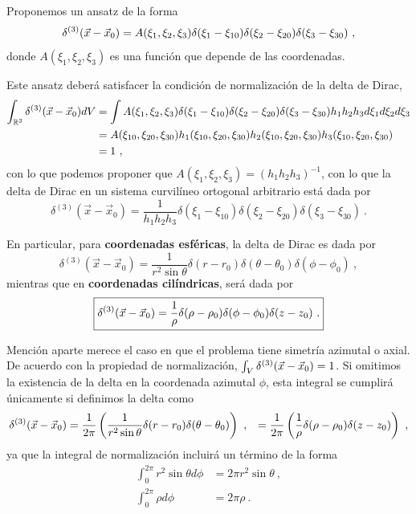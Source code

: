 \begin{demo}
    Proponemos un ansatz de la forma
    \begin{equation*}
        \delta^{(3)} (\vec{x}-\vec{x}_0) = A(\xi_1, \xi_2, \xi_3) \delta(\xi_1 - \xi_{10}) \delta(\xi_2 - \xi_{20}) \delta(\xi_3 - \xi_{30}) \ ,
    \end{equation*}
    donde $A(\xi_1, \xi_2, \xi_3)$ es una función que depende de las coordenadas.

    Este ansatz deberá satisfacer la condición de normalización de la delta de Dirac, 
    \begin{align*}
        \int_{\mathbb{R}^3} \delta^{(3)} (\vec{x} - \vec{x}_0) dV & = \int A(\xi_1, \xi_2, \xi_3) \delta(\xi_1 - \xi_{10}) \delta(\xi_2 - \xi_{20}) \delta(\xi_3 - \xi_{30}) h_1 h_2 h_3 d\xi_1 d\xi_2 d\xi_3 \\ 
        & = A(\xi_{10}, \xi_{20}, \xi_{30}) h_1(\xi_{10}, \xi_{20}, \xi_{30}) h_2(\xi_{10}, \xi_{20}, \xi_{30}) h_3(\xi_{10}, \xi_{20}, \xi_{30}) \\
        & = 1 \ ,
    \end{align*}
    con lo que podemos proponer que $A(\xi_1, \xi_2, \xi_3) = (h_1 h_2 h_3)^{-1}$, con lo que la delta de Dirac en un sistema curvilíneo ortogonal arbitrario está dada por
    \begin{equation*}
        \delta^{(3)}(\vec{x}-\vec{x}_0) = \frac{1}{h_1 h_2 h_3} \delta(\xi_1 - \xi_{10}) \delta(\xi_2 - \xi_{20}) \delta(\xi_3 - \xi_{30}) \ .
    \end{equation*}
\end{demo}

En particular, para \textbf{coordenadas esféricas}, la delta de Dirac es dada por
\begin{equation}
    \boxed{\delta^{(3)}(\vec{x} - \vec{x}_0) = \frac{1}{r^2 \sin\theta} \delta(r-r_0) \delta(\theta-\theta_0) \delta(\phi - \phi_0) \ ,}
\end{equation}
mientras que en \textbf{coordenadas cilíndricas}, será dada por
\begin{equation}
    \boxed{\delta^{(3)}(\x - \x_0) = \frac{1}{\rho} \delta(\rho - \rho_0) \delta(\phi-\phi_0) \delta(z-z_0) \ .}
\end{equation}

Mención aparte merece el caso en que el problema tiene simetría azimutal o axial. De acuerdo con la propiedad de normalización, $\int_V \delta^{(3)}(\vec{x}-\vec{x}_0) = 1$. Si omitimos la existencia de la delta en la coordenada azimutal $\phi$, esta integral se cumplirá únicamente si definimos la delta como
\begin{align*}
    \delta^{(3)}(\x - \x_0) & = \frac{1}{2\pi} \left( \frac{1}{r^2\sin\theta} \delta(r-r_0) \delta(\theta-\theta_0) \right) \ ,
    & = \frac{1}{2\pi} \left( \frac{1}{\rho} \delta(\rho - \rho_0) \delta(z-z_0) \right) \ ,
\end{align*}
ya que la integral de normalización incluirá un término de la forma
\begin{align*}
    \int_0^{2\pi} r^2 \sin \theta d\phi & = 2\pi r^2 \sin \theta \ , \\
    \int_0^{2\pi} \rho d\phi & = 2\pi \rho \ .
\end{align*}

